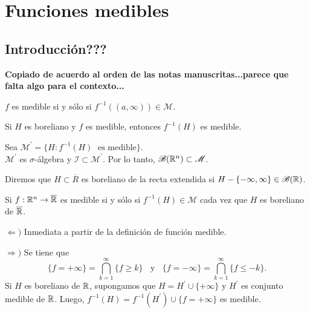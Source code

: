 \chapter{Funciones medibles
}

\section{Introducci\'on???}

\textbf{ Copiado de acuerdo al orden de las notas manuscritas...parece que falta algo para el contexto...}



\begin{definicion}{}
$f$ es medible si y s\'olo si $f^{-1}((a,\infty)) \in \mathscr{M}$. 
\end{definicion}

\begin{teorema}{}
Si $H$ es boreliano y $f$ es medible, entonces $f^{-1}(H)$ es medible.
\end{teorema}

\begin{demo}{}
Sea $\mathscr{M}^{'}=\{ H: f^{-1}(H)\;\mbox{ es medible}\}$.\\
$\mathscr{M}^{'}$ es $\sigma$-\'algebra y $\mathscr{I}\subset \mathscr{M}^{'}$.
Por lo tanto, $\mathscr{B}(\mathbb{R}^n) \subset \mathscr{M}$.
\end{demo}

\begin{definicion}{}
Diremos que $H \subset \overline{R}$ es boreliano de la recta extendida si $H-\{ -\infty, \infty\} \in \mathscr{B}(\mathbb{R})$.
\end{definicion}

\begin{teorema}{}
Si $f:\mathbb{R}^n \to \overline{\mathbb{R}}$ es medible si y s\'olo si $f^{-1}(H) \in \mathscr{M}$ cada vez que $H$ es boreliano de $\overline{\mathbb{R}}$.
\end{teorema}

\begin{demo}
$\Leftarrow)$ Inmediata a partir de la definici\'on de funci\'on medible.

$\Rightarrow)$ Se tiene que 
\[
\{f=+\infty\}=\bigcap\limits_{k=1}^{\infty} \{f \geq k\}
\;\;\mbox{ y }\;\;
\{f=-\infty\}=\bigcap\limits_{k=1}^{\infty} \{f \leq -k\}.
\]
Si $H$ es boreliano de $\mathbb{R}$, supongamos que $H=H^{'}\cup \{+\infty\}$ y $H^{'}$ es conjunto medible de $\mathbb{R}$.
Luego, $f^{-1}(H)=f^{-1}(H^{'})\cup \{f=+\infty\}$ es medible.
\end{demo}



